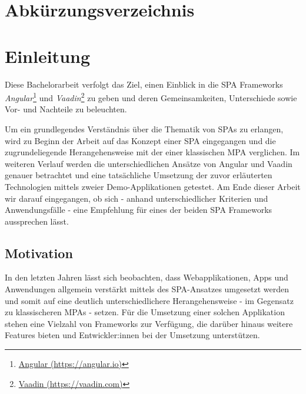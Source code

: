 \documentclass[a4paper,12pt,twoside]{scrreprt}
\begin{document}
\chapter*{Abkürzungsverzeichnis}
\begin{acronym}
\end{acronym}

\cleardoublepage
{}
\chapter{Einleitung}
\label{chap:einleitung}
Diese Bachelorarbeit verfolgt das Ziel, einen Einblick in die \ac{SPA} Frameworks \textit{Angular}\footnote{\href{https://angular.io/}{Angular (https://angular.io)}} und \textit{Vaadin}\footnote{\href{https://vaadin.com/}{Vaadin (https://vaadin.com)}} zu geben und deren Gemeinsamkeiten, Unterschiede sowie Vor- und Nachteile zu beleuchten.

\medskip

Um ein grundlegendes Verständnis über die Thematik von \acp{SPA} zu erlangen, wird zu Beginn der Arbeit auf das Konzept einer \ac{SPA} eingegangen und die zugrundeliegende Herangehensweise mit der einer klassischen \ac{MPA} verglichen. Im weiteren Verlauf werden die unterschiedlichen Ansätze von Angular und Vaadin genauer betrachtet und eine tatsächliche Umsetzung der zuvor erläuterten Technologien mittels zweier Demo-Applikationen getestet. Am Ende dieser Arbeit wir darauf eingegangen, ob sich - anhand unterschiedlicher Kriterien und Anwendungsfälle - eine Empfehlung für eines der beiden \ac{SPA} Frameworks aussprechen lässt.

\section{Motivation}
\label{sec:motivation}
In den letzten Jahren lässt sich beobachten, dass Webapplikationen, Apps und Anwendungen allgemein verstärkt mittels des \ac{SPA}-Ansatzes umgesetzt werden und somit auf eine deutlich unterschiedlichere Herangehensweise - im Gegensatz zu klassischeren \acp{MPA} - setzen. \parencite[][]{ismail_why_2019} Für die Umsetzung einer solchen Applikation stehen eine Vielzahl von Frameworks zur Verfügung, die darüber hinaus weitere Features bieten und Entwickler:innen bei der Umsetzung unterstützen.
\end{document}
